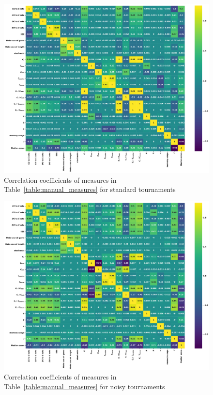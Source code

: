 \documentclass{article}
\begin{document}
\begin{figure}[!htbp]
        \begin{center}
            \includegraphics[width=.75\linewidth]{../images/standard_correlation_plot.pdf}
        \end{center}
        \caption{Correlation coefficients of measures in Table~\ref{table:manual_measures}
        for standard tournaments}
\end{figure}
\begin{figure}[!htbp]
    \begin{center}
        \includegraphics[width=.75\linewidth]{../images/noise_correlation_plot.pdf}
    \end{center}
    \caption{Correlation coefficients of measures in Table~\ref{table:manual_measures}
    for noisy tournaments}
\end{figure}
\end{document}
